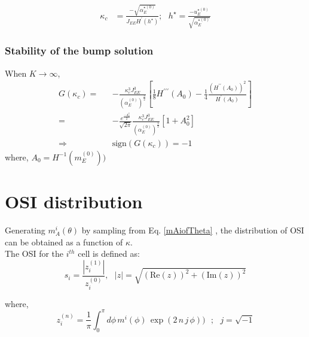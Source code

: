 \documentclass[a4paper]{article}
\newcommand{\sign}{\text{sign}}
\begin{document}
\begin{eqnarray}
\kappa_{c} &= \frac{ - \sqrt{\alpha_E^{\star (0)}}}{J_{EE} H^{\prime}(h^{\star})}; \,\,\,\, h^{\star} = \frac{- u_E^{\star (0)}}{\sqrt{\alpha_E^{\star (0)}}} 
\end{eqnarray}

\subsubsection*{Stability of the bump solution}
When $K \rightarrow \infty$, 
\begin{eqnarray}
G(\kappa_c)  =&& -\frac{\kappa^3_c J_{EE}^{3}}{\left( \alpha_E^(0) \right)^{\frac{3}{2}}} \left[ \frac{1}{8} H^{\prime \prime \prime} (A_0) - \frac{1}{4} \frac{\left( H^{\prime \prime} (A_0)\right)^2 }{H^{\prime}(A_0)} \right] \\
=&& - \frac{e^{\frac{-A^2_0}{2}}}{\sqrt{2 \pi}} \frac{\kappa^3_c J_{EE}^{3}}{\left( \alpha_E^(0) \right)^{\frac{3}{2}}}  \left[1 + A^2_0 \right] \\
\Rightarrow&& \sign(G(\kappa_c)) = -1
\end{eqnarray}
where, $A_{0} = H^{-1}(m_E^{(0)}))$


\section*{OSI distribution}
\newcommand{\mZero}{m_E^{(0)}}
\newcommand{\mOne}{m_E^{(1)}}
\newcommand{\zZero}{z^{(0)}}
\newcommand{\zOne}{z^{(1)}}
Generating $m_A^i(\theta)$ by sampling from Eq. \ref{mAiofTheta} , the distribution of OSI can be obtained as a function of $\kappa$. \\
The OSI for the $i^{th}$ cell is defined as: 
\begin{equation}
s_{i} = \frac{| \zOne_i |}{ \zZero_i}, \,\,\,\, |z| = \sqrt{(\mathrm{Re}(z))^2 + (\mathrm{Im}(z))^2}
\label{defosi}
\end{equation}

where,\\
\begin{equation}
z_i^{(n)} = \frac{1}{\pi} \int_0^{\pi} d \phi \,  m^i(\phi) \, \exp (2 \, n \,  j \, \phi)) \,\,\,\,; \,\,\,\, j = \sqrt{-1}
\end{equation}
\end{document}
